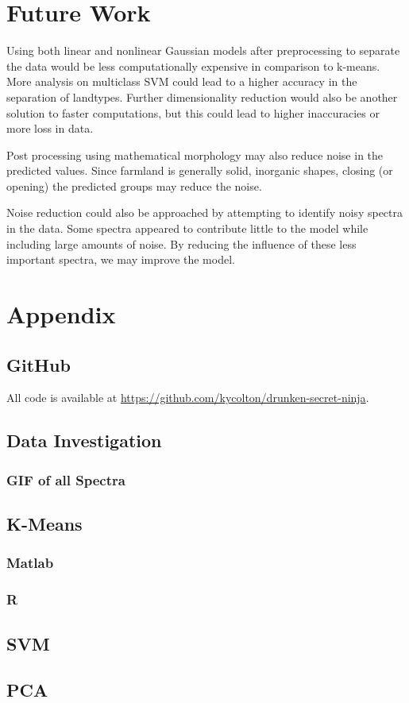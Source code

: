 \documentclass[10pt,letterpaper]{article}
\begin{document}
\section{Future Work}
Using both linear and nonlinear Gaussian models after preprocessing to separate the data would be less computationally expensive in comparison to k-means. More analysis on multiclass SVM could lead to a higher accuracy in the separation of landtypes. Further dimensionality reduction would also be another solution to faster computations, but this could lead to higher inaccuracies or more loss in data.

Post processing using mathematical morphology may also reduce noise in the predicted values. Since farmland is generally solid, inorganic shapes, closing (or opening) the predicted groups may reduce the noise.

Noise reduction could also be approached by attempting to identify noisy spectra in the data. Some spectra appeared to contribute little to the model while including large amounts of noise. By reducing the influence of these less important spectra, we may improve the model.
\pagebreak
\section{Appendix}
\subsection{GitHub}
All code is available at \url{https://github.com/kycolton/drunken-secret-ninja}.
\subsection{Data Investigation}
\subsubsection{GIF of all Spectra}
\subsection{K-Means}
\subsubsection{Matlab}
\subsubsection{R}

\subsection{SVM}

\subsection{PCA}

\end{document}
